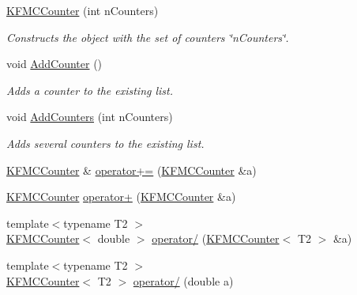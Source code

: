 \begin{DoxyCompactItemize}
\item 
\hyperlink{structKFMCCounter_a8a32841062b0acaf28a548738ea87c5d}{K\+F\+M\+C\+Counter} (int n\+Counters)\hypertarget{structKFMCCounter_a8a32841062b0acaf28a548738ea87c5d}{}\label{structKFMCCounter_a8a32841062b0acaf28a548738ea87c5d}

\begin{DoxyCompactList}\small\item\em Constructs the object with the set of counters \char`\"{}n\+Counters\char`\"{}. \end{DoxyCompactList}\item 
void \hyperlink{structKFMCCounter_a59d6f72b851528fd3c2288c9781a13aa}{Add\+Counter} ()\hypertarget{structKFMCCounter_a59d6f72b851528fd3c2288c9781a13aa}{}\label{structKFMCCounter_a59d6f72b851528fd3c2288c9781a13aa}

\begin{DoxyCompactList}\small\item\em Adds a counter to the existing list. \end{DoxyCompactList}\item 
void \hyperlink{structKFMCCounter_a659cea7b8ede07c088d1410bd043371c}{Add\+Counters} (int n\+Counters)\hypertarget{structKFMCCounter_a659cea7b8ede07c088d1410bd043371c}{}\label{structKFMCCounter_a659cea7b8ede07c088d1410bd043371c}

\begin{DoxyCompactList}\small\item\em Adds several counters to the existing list. \end{DoxyCompactList}\item 
\hyperlink{structKFMCCounter}{K\+F\+M\+C\+Counter} \& \hyperlink{structKFMCCounter_a757eb657a8f3ebda472b20a190643770}{operator+=} (\hyperlink{structKFMCCounter}{K\+F\+M\+C\+Counter} \&a)
\item 
\hyperlink{structKFMCCounter}{K\+F\+M\+C\+Counter} \hyperlink{structKFMCCounter_a94d9a8052083940bb40f04c7d8569210}{operator+} (\hyperlink{structKFMCCounter}{K\+F\+M\+C\+Counter} \&a)
\item 
{\footnotesize template$<$typename T2 $>$ }\\\hyperlink{structKFMCCounter}{K\+F\+M\+C\+Counter}$<$ double $>$ \hyperlink{structKFMCCounter_a1e0dabec8f1a0f51d4a45d20a250063f}{operator/} (\hyperlink{structKFMCCounter}{K\+F\+M\+C\+Counter}$<$ T2 $>$ \&a)
\item 
{\footnotesize template$<$typename T2 $>$ }\\\hyperlink{structKFMCCounter}{K\+F\+M\+C\+Counter}$<$ T2 $>$ \hyperlink{structKFMCCounter_a7f2f213ca3e091b7dc671b47625fe247}{operator/} (double a)
\end{DoxyCompactItemize}

